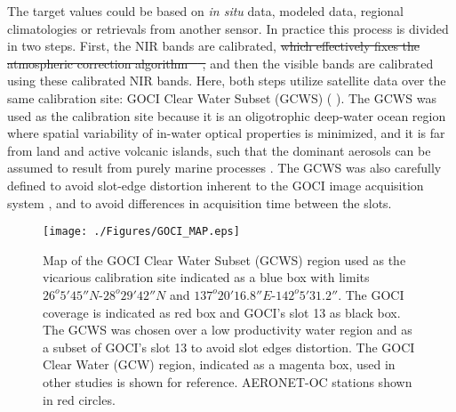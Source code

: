 \documentclass[]{interact}
\theoremstyle{plain}%
\theoremstyle{definition}
\theoremstyle{remark}
\providecommand{\DIFaddtex}[1]{{\protect\color{blue}\uwave{#1}}} %
\providecommand{\DIFdeltex}[1]{{\protect\color{red}\sout{#1}}}                      %
\providecommand{\DIFaddbegin}{} %
\providecommand{\DIFaddend}{} %
\providecommand{\DIFdelbegin}{} %
\providecommand{\DIFdelend}{} %
\providecommand{\DIFadd}[1]{\texorpdfstring{\DIFaddtex{#1}}{#1}} %
\providecommand{\DIFdel}[1]{\texorpdfstring{\DIFdeltex{#1}}{}} %
\newcommand{\DIFscaledelfig}{0.5}
\newlength{\DIFdelgraphicswidth} %
\newlength{\DIFdelgraphicsheight} %
\newcommand{\DIFaddincludegraphics}[2][]{{\color{blue}\fbox{\DIFOincludegraphics[#1]{#2}}}} %
\newcommand{\DIFdelincludegraphics}[2][]{%
\sbox{\DIFdelgraphicsbox}{\DIFOincludegraphics[#1]{#2}}%
\settoboxwidth{\DIFdelgraphicswidth}{\DIFdelgraphicsbox} %
\settoboxtotalheight{\DIFdelgraphicsheight}{\DIFdelgraphicsbox} %
\scalebox{\DIFscaledelfig}{%
\parbox[b]{\DIFdelgraphicswidth}{\usebox{\DIFdelgraphicsbox}\\[-\baselineskip] \rule{\DIFdelgraphicswidth}{0em}}\llap{\resizebox{\DIFdelgraphicswidth}{\DIFdelgraphicsheight}{%
\setlength{\unitlength}{\DIFdelgraphicswidth}%
\begin{picture}(1,1)%
\thicklines\linethickness{2pt} %
{\color[rgb]{1,0,0}\put(0,0){\framebox(1,1){}}}%
{\color[rgb]{1,0,0}\put(0,0){\line( 1,1){1}}}%
{\color[rgb]{1,0,0}\put(0,1){\line(1,-1){1}}}%
\end{picture}%
}\hspace*{3pt}}} %
} %
\DeclareRobustCommand{\DIFaddbegin}{\DIFOaddbegin \let\includegraphics\DIFaddincludegraphics} %
\DeclareRobustCommand{\DIFaddend}{\DIFOaddend \let\includegraphics\DIFOincludegraphics} %
\DeclareRobustCommand{\DIFdelbegin}{\DIFOdelbegin \let\includegraphics\DIFdelincludegraphics} %
\DeclareRobustCommand{\DIFdelend}{\DIFOaddend \let\includegraphics\DIFOincludegraphics} %
\begin{document}
The target values could be based on {\it in situ } data, modeled data, regional climatologies or retrievals from another sensor. In practice this process is divided in two steps. First, the NIR bands are calibrated, \DIFdelbegin \DIFdel{which effectively fixes the atmospheric correction algorithm \mbox{%
\citep{Franz:07}}%
, }\DIFdelend and then the visible bands are calibrated using these calibrated NIR bands.  Here, both steps utilize satellite data over the same calibration site: GOCI Clear Water Subset (GCWS) (\DIFdelbegin %
\DIFdelend \DIFaddbegin \DIFadd{Fig. \ref{fig:GOCI_map}}\DIFaddend ). The GCWS was used as the calibration site because it is an oligotrophic deep-water ocean region where spatial variability of in-water optical properties is minimized, and it is far from land and active volcanic islands, such that the dominant aerosols can be assumed to result from purely marine processes \citep{Franz:07}. The GCWS was also carefully defined to avoid slot-edge distortion inherent to the GOCI image acquisition system \citep{Kim:2015,Kim:2016}, and to avoid differences in acquisition time between the slots. 
\begin{figure}[H]
  \centering
  \texttt{[image: ./Figures/GOCI\_MAP.eps]}
    \caption{Map of the GOCI Clear Water Subset (GCWS) region used as the vicarious calibration site indicated as a blue box with limits $26^o 5' 45''N$-$28^o 29' 42''N$ and $137^o 20' 16.8''E$-$142^o 5' 31.2''$. The GOCI coverage is indicated as red box and GOCI's slot 13 as black box. The GCWS was chosen over a low productivity water region and as a subset of GOCI's slot 13 to avoid slot edges distortion. The GOCI Clear Water (GCW) region, indicated as a magenta box, used in other studies is shown for reference. AERONET-OC stations shown in red circles. \label{fig:GOCI_map}} 
\end{figure}


\end{document}
